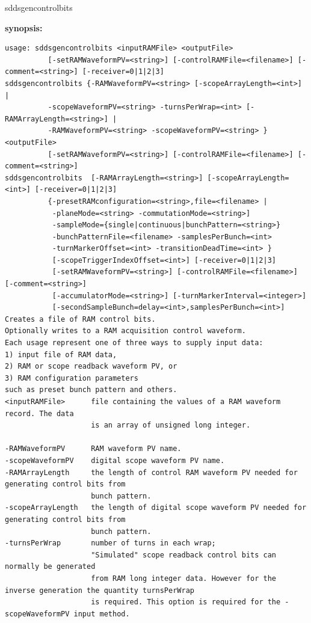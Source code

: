 \begin{sddsprog}{sddsgencontrolbits}
\item \textbf{synopsis:}
\small
\begin{verbatim}
usage: sddsgencontrolbits <inputRAMFile> <outputFile>
          [-setRAMWaveformPV=<string>] [-controlRAMFile=<filename>] [-comment=<string>] [-receiver=0|1|2|3]
sddsgencontrolbits {-RAMWaveformPV=<string> [-scopeArrayLength=<int>] |
          -scopeWaveformPV=<string> -turnsPerWrap=<int> [-RAMArrayLength=<string>] |
          -RAMWaveformPV=<string> -scopeWaveformPV=<string> } <outputFile>
          [-setRAMWaveformPV=<string>] [-controlRAMFile=<filename>] [-comment=<string>]
sddsgencontrolbits  [-RAMArrayLength=<string>] [-scopeArrayLength=<int>] [-receiver=0|1|2|3]
          {-presetRAMconfiguration=<string>,file=<filename> |
           -planeMode=<string> -commutationMode=<string>]
           -sampleMode={single|continuous|bunchPattern=<string>}
           -bunchPatternFile=<filename> -samplesPerBunch=<int>
           -turnMarkerOffset=<int> -transitionDeadTime=<int> }
           [-scopeTriggerIndexOffset=<int>] [-receiver=0|1|2|3]
           [-setRAMWaveformPV=<string>] [-controlRAMFile=<filename>] [-comment=<string>]
           [-accumulatorMode=<string>] [-turnMarkerInterval=<integer>]
           [-secondSampleBunch=delay=<int>,samplesPerBunch=<int>]
Creates a file of RAM control bits.
Optionally writes to a RAM acquisition control waveform.
Each usage represent one of three ways to supply input data:
1) input file of RAM data,
2) RAM or scope readback waveform PV, or
3) RAM configuration parameters
such as preset bunch pattern and others.
<inputRAMFile>      file containing the values of a RAM waveform record. The data
                    is an array of unsigned long integer.

-RAMWaveformPV      RAM waveform PV name.
-scopeWaveformPV    digital scope waveform PV name.
-RAMArrayLength     the length of control RAM waveform PV needed for generating control bits from
                    bunch pattern.
-scopeArrayLength   the length of digital scope waveform PV needed for generating control bits from
                    bunch pattern.
-turnsPerWrap       number of turns in each wrap;
                    "Simulated" scope readback control bits can normally be generated
                    from RAM long integer data. However for the inverse generation the quantity turnsPerWrap
                    is required. This option is required for the -scopeWaveformPV input method.


\end{verbatim}
\end{sddsprog}
